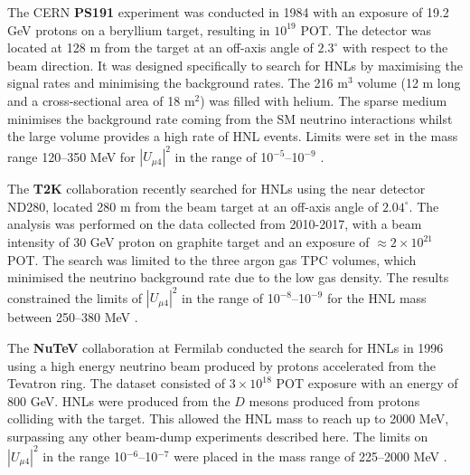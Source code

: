 \begin{coloritemize}
\item The CERN \textbf{PS191} experiment was conducted in 1984 with an exposure of 19.2 GeV protons on a beryllium target, resulting in $10^{19}$ POT.
The detector was located at 128 m from the target at an off-axis angle of $2.3^{\circ}$ with respect to the beam direction.
It was designed specifically to search for HNLs by maximising the signal rates and minimising the background rates.
The 216 m$^{3}$ volume (12 m long and a cross-sectional area of 18 m$^{2}$) was filled with helium.
The sparse medium minimises the background rate coming from the SM neutrino interactions whilst the large volume provides a high rate of HNL events. 
Limits were set in the mass range 120--350 MeV for $|U_{\mu4}|^{2}$ in the range of 10$^{-5}$--10$^{-9}$ \cite{PS191A, PS191B}.
	
\item The \textbf{T2K} collaboration recently searched for HNLs using the near detector ND280, located 280 m from the beam target at an off-axis angle of $2.04^{\circ}$.
The analysis was performed on the data collected from 2010-2017, with a beam intensity of 30 GeV proton on graphite target and an exposure of $\approx 2 \times 10^{21}$ POT.
The search was limited to the three argon gas TPC volumes, which minimised the neutrino background rate due to the low gas density.
The results constrained the limits of $|U_{\mu4}|^{2}$ in the range of 10$^{-8}$--10$^{-9}$ for the HNL mass between 250--380 MeV \cite{T2KHNL}.

\item The \textbf{NuTeV} collaboration at Fermilab conducted the search for HNLs in 1996 using a high energy neutrino beam produced by protons accelerated from the Tevatron ring.
The dataset consisted of $3 \times 10^{18}$ POT exposure with an energy of 800 GeV.
HNLs were produced from the $D$ mesons produced from protons colliding with the target.
This allowed the HNL mass to reach up to 2000 MeV, surpassing any other beam-dump experiments described here.
The limits on $|U_{\mu4}|^{2}$ in the range 10$^{-6}$--10$^{-7}$ were placed in the mass range of 225--2000 MeV \cite{NuTeV}.


\end{coloritemize}
